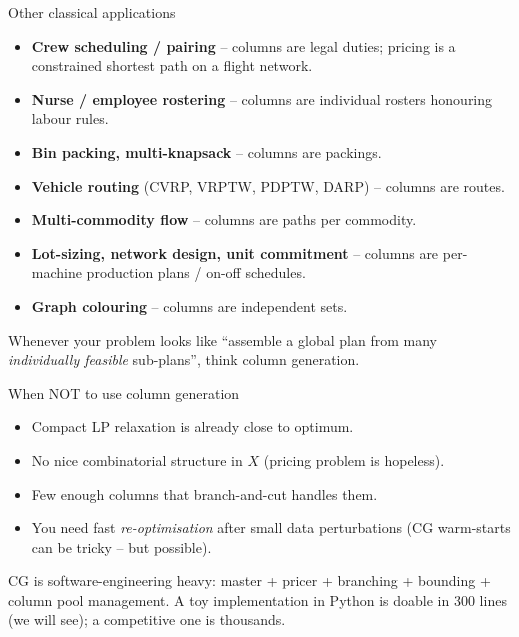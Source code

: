 \documentclass[10pt,aspectratio=169]{beamer}
\begin{document}
\begin{frame}{Other classical applications}
  \begin{itemize}\setlength{\itemsep}{4pt}
    \item \textbf{Crew scheduling / pairing} -- columns are legal duties;
          pricing is a constrained shortest path on a flight network.
    \item \textbf{Nurse / employee rostering} -- columns are individual rosters
          honouring labour rules.
    \item \textbf{Bin packing, multi-knapsack} -- columns are packings.
    \item \textbf{Vehicle routing} (CVRP, VRPTW, PDPTW, DARP) -- columns are routes.
    \item \textbf{Multi-commodity flow} -- columns are paths per commodity.
    \item \textbf{Lot-sizing, network design, unit commitment} -- columns are
          per-machine production plans / on-off schedules.
    \item \textbf{Graph colouring} -- columns are independent sets.
  \end{itemize}
  \vfill
  \begin{keybox}[Pattern]
    Whenever your problem looks like ``assemble a global plan from many
    \emph{individually feasible} sub-plans'', think column generation.
  \end{keybox}
\end{frame}

\begin{frame}{When NOT to use column generation}
  \begin{itemize}
    \item Compact LP relaxation is already close to optimum.
    \item No nice combinatorial structure in $X$ (pricing problem is hopeless).
    \item Few enough columns that branch-and-cut handles them.
    \item You need fast \emph{re-optimisation} after small data perturbations
          (CG warm-starts can be tricky -- but possible).
  \end{itemize}
  \vspace{0.5em}
  \begin{warnbox}
    CG is software-engineering heavy: master + pricer + branching + bounding +
    column pool management. A toy implementation in Python is doable in
    300 lines (we will see); a competitive one is thousands.
  \end{warnbox}
\end{frame}
\end{document}
